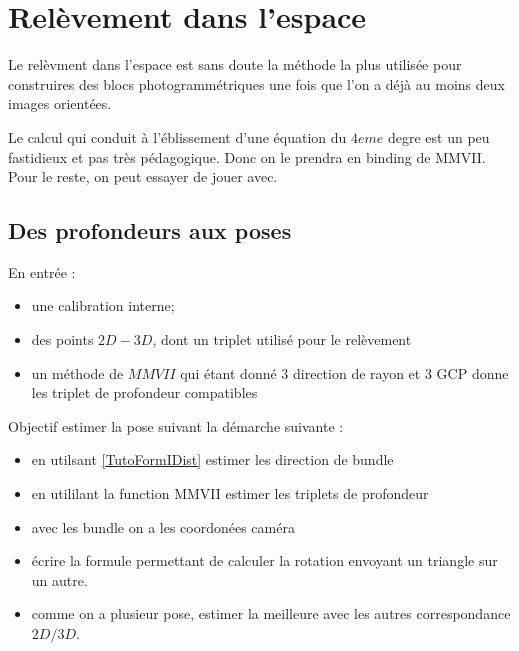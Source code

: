 
\section{Relèvement dans l'espace}

Le relèvment dans l'espace est sans doute la méthode la plus utilisée
pour construires des blocs photogrammétriques une fois que l'on a déjà au moins 
deux images orientées.

Le calcul qui conduit à l'éblissement d'une équation du $4eme$ degre
est un peu fastidieux et pas très pédagogique. Donc on le prendra 
en binding de MMVII. Pour le reste, on peut essayer de jouer avec.


\subsection{Des profondeurs aux poses}

En entrée :

\begin{itemize}
     \item une calibration interne;
     \item des points $2D-3D$, dont un triplet utilisé pour le relèvement
     \item un méthode de $MMVII$ qui étant donné $3$ direction de rayon et $3$
          GCP  donne les triplet de profondeur compatibles
\end{itemize}

Objectif estimer la pose suivant la démarche suivante :

\begin{itemize}
    \item en utilsant \ref{TutoFormIDist} estimer les direction de bundle
    \item en utililant la function MMVII estimer les triplets de profondeur
    \item avec les bundle on a les coordonées caméra
    \item écrire la formule permettant de calculer la rotation envoyant un triangle sur un autre.
    \item comme on a plusieur pose, estimer la meilleure avec les autres correspondance $2D/3D$.
\end{itemize}

